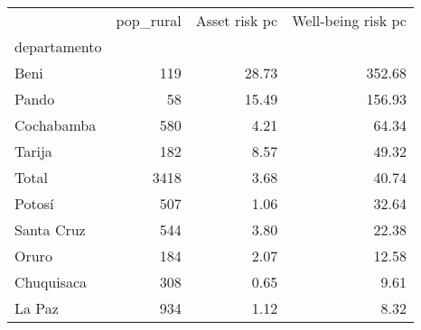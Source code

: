 \begin{tabular}{lrrr}
\toprule
{} &  pop\_rural &  Asset risk pc &  Well-being risk pc \\
departamento &            &                &                     \\
\midrule
Beni         &        119 &          28.73 &              352.68 \\
Pando        &         58 &          15.49 &              156.93 \\
Cochabamba   &        580 &           4.21 &               64.34 \\
Tarija       &        182 &           8.57 &               49.32 \\
Total        &       3418 &           3.68 &               40.74 \\
Potosí       &        507 &           1.06 &               32.64 \\
Santa Cruz   &        544 &           3.80 &               22.38 \\
Oruro        &        184 &           2.07 &               12.58 \\
Chuquisaca   &        308 &           0.65 &                9.61 \\
La Paz       &        934 &           1.12 &                8.32 \\
\bottomrule
\end{tabular}
